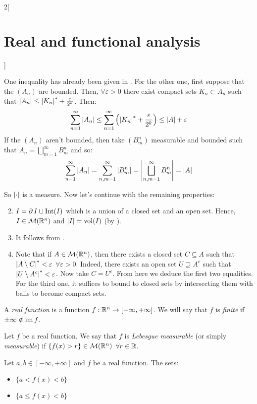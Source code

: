 \documentclass[../../../main_math.tex]{subfiles}
\begin{document}
\begin{multicols}{2}[\section{Real and functional analysis}]
\begin{sproof}
\begin{itemize}
            One inequality has already been given in . For the other one, first suppose that the $(A_n)$ are bounded. Then, $\forall \varepsilon >0$ there exist compact sets $K_n\subset A_n$ such that $\m{A_n}\leq \om{K_n}+\frac{\varepsilon}{2^k}$. Then:
            $$\sum_{n=1}^\infty \m{A_n}\leq \sum_{n=1}^\infty\left(\om{K_n}+\frac{\varepsilon}{2^k}\right)\leq \m{A}+\varepsilon$$
            If the $(A_n)$ aren't bounded, then take $(B_m^n)$ measurable and bounded such that $A_n=\bigsqcup_{m=1}^\infty B_m^n$ and so:
            $$\sum_{n=1}^\infty \m{A_n}=\sum_{n,m=1}^\infty \m{B_m^n}= \m{\bigsqcup_{n,m=1}^\infty B_m^n}=\m{A}$$
    \end{itemize}
    So $\m{\cdot}$ is a measure. Now let's continue with the remaining properties:
    \begin{enumerate}\setcounter{enumi}{1}
      \item $I=\operatorname{\partial}{I}\cup\operatorname{Int}(I)$ which is a union of a closed set and an open set. Hence, $I\in\mathcal{M}(\mathbb{R}^n)$ and $\m{I}=\vol(I)$ (by ).
      \item It follows from .
      \item Note that if $A\in\mathcal{M}(\mathbb{R}^n)$, then there exists a closed set $C\subseteq A$ such that $\om{A\setminus C}<\varepsilon$ $\forall\varepsilon>0$. Indeed, there exists an open set $U\supseteq A^c$ such that $\om{U\setminus A^c}<\varepsilon$. Now take $C=U^c$. From here we deduce the first two equalities. For the third one, it suffices to bound to closed sets by intersecting them with balls to become compact sets.
    \end{enumerate}
  \end{sproof}
  \begin{definition}
    A \emph{real function} is a function $f:\mathbb{R}^n\rightarrow[-\infty,+\infty]$. We will say that $f$ is \emph{finite} if $\pm\infty\notin\operatorname{im} f$.
  \end{definition}
  \begin{definition}
    Let $f$ be a real function. We say that $f$ is \emph{Lebesgue measurable} (or simply \emph{measurable}) if $\{f(x)> r\}\in \mathcal{M}(\mathbb{R}^n)$ $\forall r\in\mathbb{R}$.
  \end{definition}
  \begin{lemma}\label{RFA:lemmamesurable}
    Let $a,b\in[-\infty,+\infty]$ and $f$ be a real function. The sets:
    \begin{itemize}
      \item $\{a<f(x)<b\}$
      \item $\{a\leq f(x)<b\}$

\end{itemize}
\end{lemma}
\end{multicols}
\end{document}
